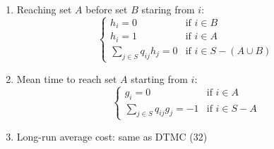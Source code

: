 \documentclass[11pt,a4paper]{article}
\begin{document}
\begin{enumerate}[resume]
\item Reaching set $A$ before set $B$ staring from $i$: \[
\begin{cases}
h_i = 0 &\text{if } i \in B \\
h_i = 1 &\text{if } i \in A \\
\sum_{j \in S} q_{ij} h_j =0 &\text{if } i \in S-(A \cup B)
\end{cases}
\]

\item Mean time to reach set $A$ starting from $i$: \[
\begin{cases}
g_i = 0 &\text{if } i \in A \\
\sum_{j \in S} q_{ij} g_j = -1 &\text{if } i \in S-A
\end{cases}
\]

\item Long-run average cost: same as DTMC (32)
\end{enumerate}
\end{document}
